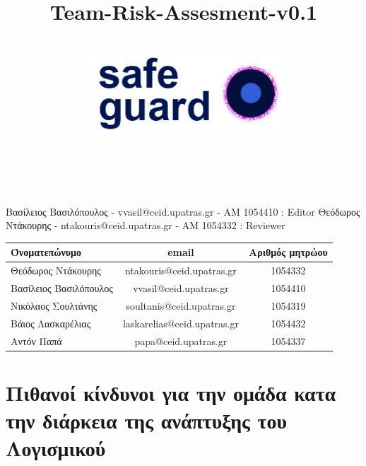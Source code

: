 \documentclass{article}
\title{Team-Risk-Assesment-v0.1}
\author{\\
\includegraphics[width=3in]{safeguard}\\[1ex]\\\\
}
\begin{document}
\maketitle

\clearpage

Βασίλειος Βασιλόπουλος - vvasil@ceid.upatras.gr - ΑΜ 1054410 : Editor
Θεόδωρος Ντάκουρης - ntakouris@ceid.upatras.gr - ΑΜ 1054332 : Reviewer

\begin{tabular}{|l|c|c|}
\hline
Όνοματεπώνυμο & email & Αριθμός μητρώου  \\
\hline
Θεόδωρος Ντάκουρης & ntakouris@ceid.upatras.gr & 1054332 \\
Βασίλειος Βασιλόπουλος & vvasil@ceid.upatras.gr &  1054410\\
Νικόλαος Σουλτάνης & soultanis@ceid.upatras.gr & 1054319  \\
Βάιος Λασκαρέλιας & laskarelias@ceid.upatras.gr & 1054432 \\
Αντόν Παπά & papa@ceid.upatras.gr & 1054337 \\
\hline
\end{tabular}

\renewcommand{\contentsname}{Περιεχόμενα}
\tableofcontents

\newpage

\section{Πιθανοί κίνδυνοι για την ομάδα κατα την διάρκεια της ανάπτυξης του Λογισμικού}
    
\end{document}
